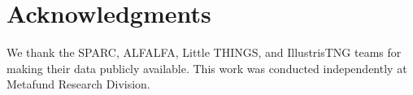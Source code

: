 \documentclass[12pt,a4paper]{article}
\begin{document}
\section*{Acknowledgments}

We thank the SPARC, ALFALFA, Little THINGS, and IllustrisTNG teams for making their data publicly available. This work was conducted independently at Metafund Research Division.



\end{document}
